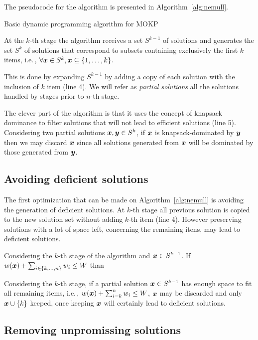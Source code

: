 The pseudocode for the algorithm is presented in Algorithm~\ref{alg:nemull}.
\begin{algorithm}
  \caption{Basic dynamic programming algorithm for MOKP}
  \label{alg:nemull}
  
\end{algorithm}
At the $k$-th stage the algorithm receives a set $S^{k-1}$ of solutions and
generates the set $S^k$ of solutions that correspond
to subsets containing exclusively the first $k$ items, i.e.\,,
$\forall\boldsymbol{x} \in S^k, \boldsymbol{x} \subseteq \{1, \ldots, k\}$.

This is done by expanding $S^{k-1}$ by adding a copy of each solution with the
inclusion of $k$ item (line 4).
We will refer as \emph{partial solutions} all the solutions handled by 
stages prior to $n$-th stage.

The clever part of the algorithm is that it uses the concept of knapsack dominance
to filter solutions that will not lead to efficient solutions (line 5).
Considering two partial solutions $\boldsymbol{x}, \boldsymbol{y} \in S^k$, if
$\boldsymbol{x}$ is knapsack-dominated by $\boldsymbol{y}$ then we may discard $\boldsymbol{x}$ since all
solutions generated from $\boldsymbol{x}$ will be dominated by those generated from $\boldsymbol{y}$.

\subsection{Avoiding deficient solutions}

The first optimization that can be made on Algorithm~\ref{alg:nemull} is
avoiding the generation of deficient solutions.
At $k$-th stage all previous solution is copied to the
new solution set without adding $k$-th item (line 4).
However preserving solutions with a lot of space left, concerning the remaining itens,
may lead to deficient solutions.

\begin{theorem}
   Considering the $k$-th stage of the algorithm and $\boldsymbol{x} \in S^{k-1}$.
   If $w(\boldsymbol{x}) + \sum_{i \in {\{k, \ldots, n\}}} w_i \leq W$ than 
\end{theorem}

Considering the $k$-th stage, if a partial solution $\boldsymbol{x} \in S^{k-1}$ has enough
space to fit all remaining items, i.e.\,, $w(\boldsymbol{x}) + \sum_{i=k}^n w_i \leq W$,
$\boldsymbol{x}$ may be discarded and only $\boldsymbol{x} \cup \{k\}$ keeped, once
keeping $\boldsymbol{x}$ will certainly lead to deficient solutions.

\subsection{Removing unpromissing solutions}

